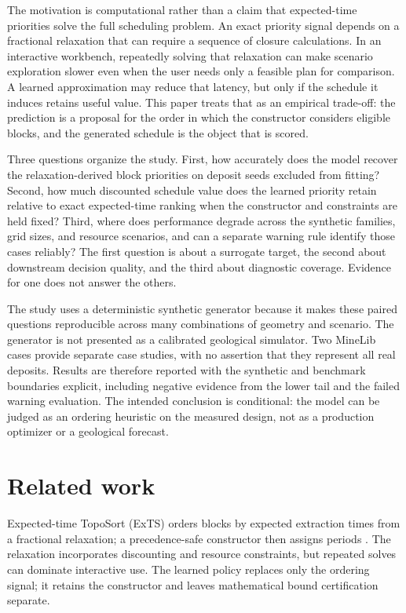 \documentclass[11pt]{article}
\begin{document}
The motivation is computational rather than a claim that expected-time priorities solve the full scheduling problem. An exact priority signal depends on a fractional relaxation that can require a sequence of closure calculations. In an interactive workbench, repeatedly solving that relaxation can make scenario exploration slower even when the user needs only a feasible plan for comparison. A learned approximation may reduce that latency, but only if the schedule it induces retains useful value. This paper treats that as an empirical trade-off: the prediction is a proposal for the order in which the constructor considers eligible blocks, and the generated schedule is the object that is scored.

Three questions organize the study. First, how accurately does the model recover the relaxation-derived block priorities on deposit seeds excluded from fitting? Second, how much discounted schedule value does the learned priority retain relative to exact expected-time ranking when the constructor and constraints are held fixed? Third, where does performance degrade across the synthetic families, grid sizes, and resource scenarios, and can a separate warning rule identify those cases reliably? The first question is about a surrogate target, the second about downstream decision quality, and the third about diagnostic coverage. Evidence for one does not answer the others.

The study uses a deterministic synthetic generator because it makes these paired questions reproducible across many combinations of geometry and scenario. The generator is not presented as a calibrated geological simulator. Two MineLib cases provide separate case studies, with no assertion that they represent all real deposits. Results are therefore reported with the synthetic and benchmark boundaries explicit, including negative evidence from the lower tail and the failed warning evaluation. The intended conclusion is conditional: the model can be judged as an ordering heuristic on the measured design, not as a production optimizer or a geological forecast.

\section{Related work}
Expected-time TopoSort (ExTS) orders blocks by expected extraction times from a fractional relaxation; a precedence-safe constructor then assigns periods \cite{chicoisne,lambert2014}. The relaxation incorporates discounting and resource constraints, but repeated solves can dominate interactive use. The learned policy replaces only the ordering signal; it retains the constructor and leaves mathematical bound certification separate.
\end{document}
